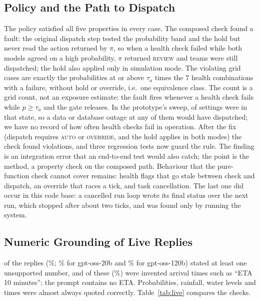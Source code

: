 \documentclass[conference]{IEEEtran}
\begin{document}
\subsection{Policy and the Path to Dispatch}
\label{sec:audit}
The policy satisfied all five properties in every case. The composed check found a fault: the original dispatch step tested the probability band and the hold but never read the action returned by $\pi$, so when a health check failed while both models agreed on a high probability, $\pi$ returned \textsc{review} and teams were still dispatched; the hold also applied only in simulation mode. The \EtoEViolBefore{} violating grid cases are exactly the \EtoEHigh{} probabilities at or above $\tau_a$ times the 7 health combinations with a failure, without hold or override, i.e.\ one equivalence class. The count is a grid count, not an exposure estimate: the fault fires whenever a health check fails while $p\ge\tau_a$ and the gate releases. In the prototype's sweep, \SweepAutoRel{} of \SweepN{} settings were in that state, so a data or database outage at any of them would have dispatched; we have no record of how often health checks fail in operation. After the fix (dispatch requires \textsc{auto} or \textsc{override}, and the hold applies in both modes) the check found \EtoEViolAfter{} violations, and three regression tests now guard the rule. The finding is an integration error that an end-to-end test would also catch; the point is the method, a property check on the composed path. Behaviour that the pure-function check cannot cover remains: health flags that go stale between check and dispatch, an override that races a tick, and task cancellation. The last one did occur in this code base: a cancelled run loop wrote its final status over the next run, which stopped after about two ticks, and was found only by running the system.

\subsection{Numeric Grounding of Live Replies}
\LiveUnsup{} of the \LiveN{} replies (\LiveUnsupPct\%; \LiveTwentyUnsupPct\% for gpt-oss-20b and \LiveOneTwentyUnsupPct\% for gpt-oss-120b) stated at least one unsupported number, and \LiveEta{} of these \LiveUnsup{} (\LiveEtaPct\%) were invented arrival times such as ``ETA 10 minutes''; the prompt contains no ETA. Probabilities, rainfall, water levels and times were almost always quoted correctly. Table~\ref{tab:live} compares the checks.
\end{document}
